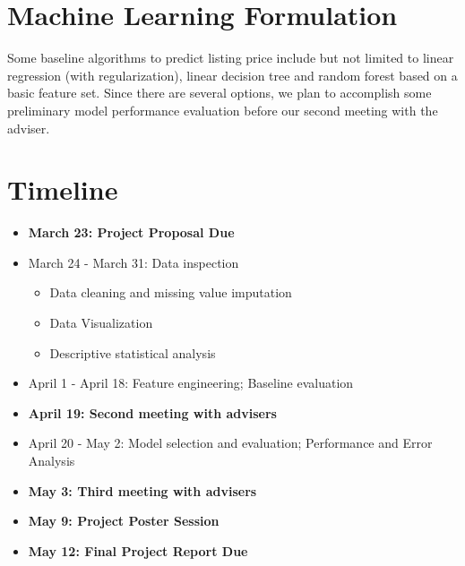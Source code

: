 \documentclass{article}
\begin{document}
	\section{Machine Learning Formulation}
	Some baseline algorithms to predict listing price include but not limited to linear regression (with regularization), linear decision tree and random forest based on a basic feature set. Since there are several options, we plan to accomplish some preliminary model performance evaluation before our second meeting with the adviser.
	
	\section{Timeline}
	\begin{itemize}
		\item \textbf{March 23: Project Proposal Due}
		\item March 24 - March 31: Data inspection
		\begin{itemize}
			\item Data cleaning and missing value imputation
			\item Data Visualization
			\item Descriptive statistical analysis
		\end{itemize}
		\item April 1 - April 18: Feature engineering; Baseline evaluation
		\item \textbf{April 19: Second meeting with advisers}
		\item April 20 - May 2: Model selection and evaluation; Performance and Error Analysis
		\item \textbf{May 3: Third meeting with advisers}
		\item \textbf{May 9: Project Poster Session}
		\item \textbf{May 12: Final Project Report Due}
	\end{itemize}
\end{document}
